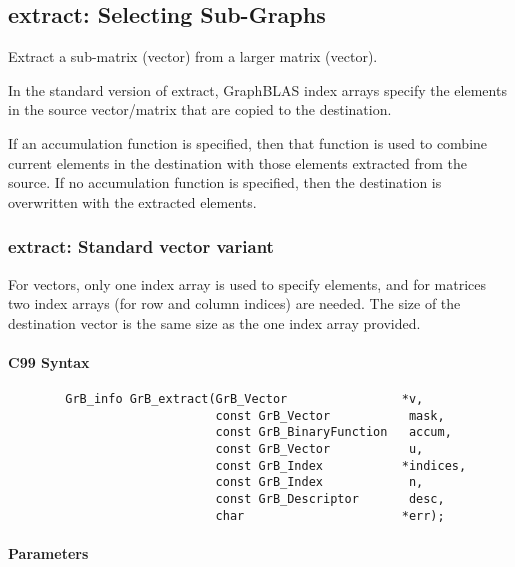 \subsection{{\sf extract}: Selecting Sub-Graphs}
\label{Sec:extract}

Extract a sub-matrix (vector) from a larger matrix (vector). 

In the standard version of {\sf extract}, GraphBLAS index arrays
specify the elements in the source vector/matrix that are copied to
the destination. 

If an accumulation function is specified, then that function is
used to combine current elements in the destination with those elements
extracted from the source. If no accumulation function is specified, then
the destination is overwritten with the extracted elements.  


\subsubsection{{\sf extract}: Standard vector variant}

For vectors, only one index array is used to specify
elements, and for matrices two index arrays (for row and column indices)
are needed.  The size of the destination vector is the same size as
the one index array provided.  

\paragraph{C99 Syntax}

\begin{verbatim}
        GrB_info GrB_extract(GrB_Vector                *v,
                             const GrB_Vector           mask,
                             const GrB_BinaryFunction   accum,
                             const GrB_Vector           u,
                             const GrB_Index           *indices,
                             const GrB_Index            n,
                             const GrB_Descriptor       desc,
                             char                      *err);
\end{verbatim}

\paragraph{Parameters}

